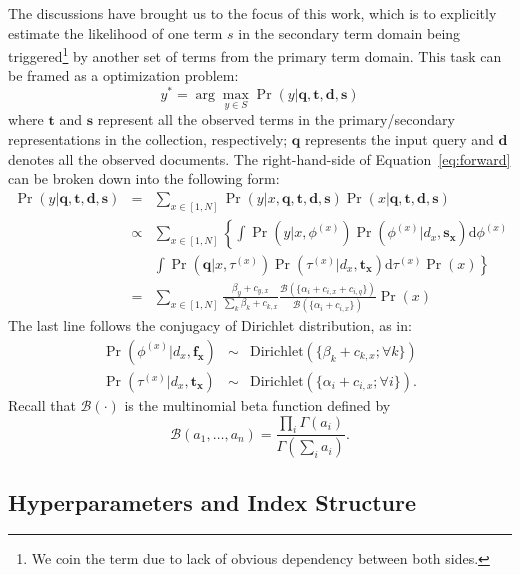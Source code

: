 The discussions have brought us to the focus of this work, which is to explicitly
estimate the likelihood of one term $s$ in the secondary term domain being
triggered\footnote{We coin the term due to lack of obvious dependency
between both sides.} by another set of terms from the primary term
domain.  This task can be framed as a optimization problem:
\begin{equation} y^* = \arg\max_{y \in S} \Pr(y|\mathbf{q}, \mathbf{t},
\mathbf{d}, \mathbf{s}) \label{eq:forward} \end{equation} where $\mathbf{t}$
and $\mathbf{s}$ represent all the observed terms in the primary/secondary
representations in the collection, respectively; $\mathbf{q}$ represents
the input query and $\mathbf{d}$ denotes all the observed documents.  The 
right-hand-side of Equation~\eqref{eq:forward} can be broken down into the following form:
\begin{eqnarray}
  \Pr(y|\mathbf{q}, \mathbf{t}, \mathbf{d}, \mathbf{s}) 
  &=& \sum_{x \in [1, N]} \Pr(y|x, \mathbf{q}, \mathbf{t}, \mathbf{d}, \mathbf{s}) \Pr(x|\mathbf{q}, \mathbf{t}, \mathbf{d}, \mathbf{s}) \nonumber\\
  &\propto& \sum_{x \in [1, N]} \left\{ \int \Pr(y|x, \phi^{(x)}) \Pr(\phi^{(x)}|d_x, \mathbf{s_x}) \mathrm{d}\phi^{(x)} \right. \nonumber\\
  && \left. \int \Pr(\mathbf{q}| x, \tau^{(x)}) \Pr(\tau^{(x)}|d_x, \mathbf{t_x})\mathrm{d}\tau^{(x)} \Pr(x) \right\} \nonumber\\
  &=& \sum_{x \in [1, N]} \frac{\beta_y + c_{y,x}}{\sum_k \beta_k + c_{k,x}} \frac{\mathcal{B}(\{\alpha_i + c_{i,x} + c_{i,q} \})}{\mathcal{B}(\{\alpha_i + c_{i,x} \})} \Pr(x) \label{eq:forward-solution}
\end{eqnarray}
The last line follows the conjugacy of Dirichlet distribution, as in:
\begin{eqnarray*}
\Pr(\phi^{(x)}|d_x,\mathbf{f_x}) &\sim& \mathrm{Dirichlet}(\{\beta_k + c_{k,x}; \forall k \}) \\
\Pr(\tau^{(x)}|d_x, \mathbf{t_x}) &\sim& \mathrm{Dirichlet}(\{\alpha_i + c_{i,x}; \forall i \}).
\end{eqnarray*}
Recall that $\mathcal{B}(\cdot)$ is the multinomial beta
function defined by \[\mathcal{B}(a_1, \ldots, a_n) = \frac{\prod_i
\Gamma(a_i)}{\Gamma(\sum_i a_i)}. \]

\subsection{Hyperparameters and Index Structure}

